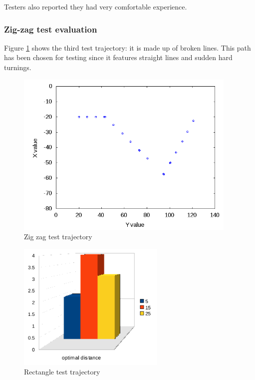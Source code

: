 %
Testers also reported they had very comfortable experience.


\subsubsection{Zig-zag test evaluation}
\label{subsubsec:zigzagtest}

Figure \ref{fig:zigzagtest} shows the third test trajectory:
it is made up of broken lines. This path has been chosen for testing
since it features straight lines and sudden hard turnings.

\begin{figure}[!h]
  \begin{center}
    \includegraphics[width=300pt]{img/path_session_6.png}
    \caption{Zig zag test trajectory}
    \label{fig:zigzagtest}
  \end{center}
\end{figure}
%

\begin{figure}[!h]
  \begin{center}
    \includegraphics[width=200pt]{img/zz_results.png}
    \caption{Rectangle test trajectory}
  \end{center}
\end{figure}

